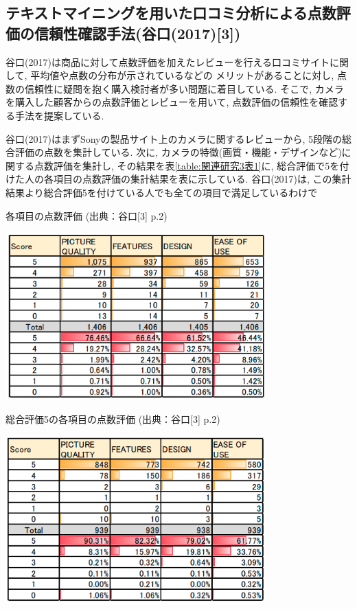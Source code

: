 \documentclass{ltjarticle}
\begin{document}
\subsection{テキストマイニングを用いた口コミ分析による点数評価の信頼性確認手法(谷口(2017)[3])}
谷口(2017)は商品に対して点数評価を加えたレビューを行える口コミサイトに関して, 平均値や点数の分布が示されているなどの
メリットがあることに対し, 点数の信頼性に疑問を抱く購入検討者が多い問題に着目している. 
そこで, カメラを購入した顧客からの点数評価とレビューを用いて, 点数評価の信頼性を確認する手法を提案している. 

谷口(2017)はまずSonyの製品サイト上のカメラに関するレビューから, 5段階の総合評価の点数を集計している. 
次に, カメラの特徴(画質・機能・デザインなど)に関する点数評価を集計し, その結果を表\ref{table:関連研究3表1}に, 
総合評価で5を付けた人の各項目の点数評価の集計結果を表に示している. 
谷口(2017)は, この集計結果より総合評価5を付けている人でも全ての項目で満足しているわけで

\begin{table}[h]
    \centering
    \caption{各項目の点数評価 (出典：谷口[3] p.2)}
    \vspace{5truept}
    \includegraphics[width = 10cm]{images/関連研究3表1.png}
    \label{table:関連研究3表1}
\end{table}
\vspace{20truept}

\newpage
\begin{table}[h]
    \centering
    \caption{総合評価5の各項目の点数評価 (出典：谷口[3] p.2)}
    \vspace{5truept}
    \includegraphics[width = 10cm]{images/関連研究3表2.png}
    \label{table:関連研究3表2}
\end{table}
\vspace*{20truept}
\end{document}
